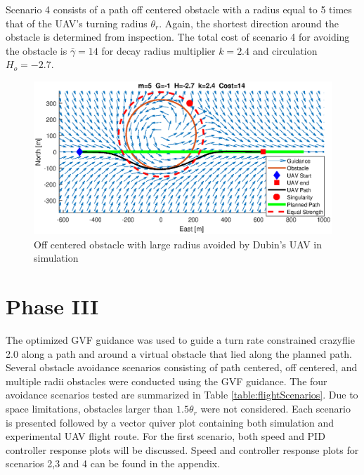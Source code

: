 \documentclass[numbered,pdftex]{ohio-etd}
\begin{document}
Scenario 4 consists of a path off centered obstacle with a radius equal to 5 times that of the UAV's turning radius $\theta_r$. Again, the shortest direction around the obstacle is determined from inspection. The total cost of scenario 4 for avoiding the obstacle is $\bar{\gamma}=14$ for decay radius multiplier $k=2.4$ and circulation $H_o = -2.7$.


\begin{figure}[H]
	\centering
	\includegraphics[trim = 0 85 0 85, clip, width=16cm]{Figures/results/m5Y05}
	\caption{Off centered obstacle with large radius avoided by Dubin's UAV in simulation}
	\label{fig:m5y05}
\end{figure}




\section{Phase III}

The optimized GVF guidance was used to guide a turn rate constrained crazyflie 2.0 along a path and around a virtual obstacle that lied along the planned path. Several obstacle avoidance scenarios consisting of path centered, off centered, and multiple radii obstacles were conducted using the GVF guidance. The four avoidance scenarios tested are summarized in Table \ref{table:flightScenarios}. Due to space limitations, obstacles larger than $1.5 \theta_r$ were not considered. Each scenario is presented followed by a vector quiver plot containing both simulation and experimental UAV flight route. For the first scenario, both speed and PID controller response plots will be discussed. Speed and controller response plots for scenarios 2,3 and 4 can be found in the appendix. 
\end{document}
